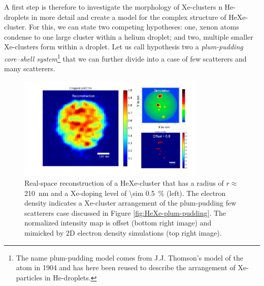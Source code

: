 %
A first step is therefore to investigate the morphology of Xe-clusters n He-droplets in more detail and create a model for the complex structure of HeXe-cluster. For this, we can state two competing hypotheses: one, xenon atoms condense to one large cluster within a helium droplet; and two, multiple smaller Xe-clusters form within a droplet. Let us call hypothesis two a \textit{plum-pudding core--shell system}\footnote{The name plum-pudding model comes from J.J. Thomson's model of the atom in 1904 and has here been reused to describe the arrangement of Xe-particles in He-droplets.} that we can further divide into a case of few scatterers and many scatterers.\\[1\baselineskip]
%
\begin{figure}
 	\centering
 		\includegraphics[width=0.80\textwidth]{images/results/reconstructions-to-simulations.png}
 	\caption[Reconstruction of HeXe-clusters and simulated electron densities.]{Real-space reconstruction of a HeXe-cluster that has a radius of $r\approx$ \SI{210}{\nano\meter} and a Xe-doping level of \SI{\sim 0.5}{\percent} (left). The electron density indicates a Xe-cluster arrangement of the plum-pudding few scatterers case discussed in Figure \ref{fig:HeXe-plum-pudding}. The normalized intensity map is offset (bottom right image) and mimicked by 2D electron density simulations (top right image).}
 	\label{fig:HeXe-cluster-60}
\end{figure}
